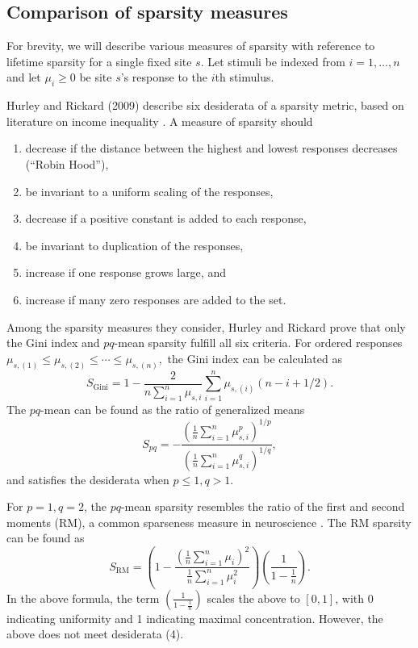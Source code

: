 \documentclass[draft]{cmustatproposal} %
\begin{document}
\subsection{Comparison of sparsity measures}
\label{appx:sparsity} 

For brevity, we will describe various measures of sparsity with reference to lifetime sparsity for a single fixed site \( s \). Let stimuli be indexed from \( i = 1, \dots, n \) and let \(\mu_{i} \geq 0 \) be site \( s \)'s response to the \(i\)th stimulus. 

Hurley and Rickard (2009) describe six desiderata of a sparsity metric, based on literature on income inequality \cite{hurley_comparing_2009}. A measure of sparsity should

\begin{enumerate}
    \item decrease if the distance between the highest and lowest responses decreases (``Robin Hood''),
    \item be invariant to a uniform scaling of the responses,  
    \item decrease if a positive constant is added to each response, 
    \item be invariant to duplication of the responses,
    \item increase if one response grows large, and  
    \item increase if many zero responses are added to the set. 
\end{enumerate}

Among the sparsity measures they consider, Hurley and Rickard prove that only the Gini index and \( pq \)-mean sparsity fulfill all six criteria. For ordered responses \( \mu_{s, (1)} \leq \mu_{s, (2)} \leq \cdots \leq \mu_{s, (n)}, \) the Gini index can be calculated as 
\[ 
S_{\textrm{Gini}} = 
1 - \frac{2}{n \sum_{i = 1}^n \mu_{s, i}} \sum_{i = 1}^n
\mu_{s, (i)} \left( n - i + 1/2 \right). \]
The \(pq\)-mean can be found as the ratio of generalized means
\[ 
S_{pq} = - \frac{\left( \frac{1}{n} \sum_{i = 1}^n \mu_{s, i}^p \right)^{1 / p}}{\left( \frac{1}{n} \sum_{i = 1}^n \mu_{s, i}^q \right)^{1/q}},
\]
and satisfies the desiderata when \( p \leq 1, q > 1 \). 

For \( p = 1, q = 2 \), the \( pq \)-mean sparsity resembles the ratio of the first and second moments (RM), a common sparseness measure in neuroscience \cite{rolls_sparseness_1995, vinje_sparse_2000}. The RM sparsity can be found as
\begin{equation}
S_{\textrm{RM}} = \left( 1 - \frac{\left( \frac{1}{n} \sum_{i = 1}^n \mu_{i} \right)^2}{\frac{1}{n} \sum_{i = 1}^n \mu_{i}^2} \right) \left( \frac{1}{1 - \frac{1}{n}} \right).
\end{equation}
In the above formula, the term \( \left( \frac{1}{1 - \frac{1}{n}} \right) \) scales the above to \( [0, 1] \), with 0 indicating uniformity and 1 indicating maximal concentration. However, the above does not meet desiderata (4). 
\end{document}
